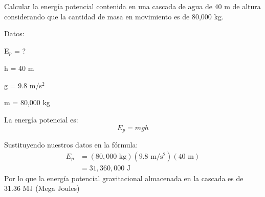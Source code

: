 \question[5] Calcular la energía potencial contenida en una cascada de agua de 40 m de altura considerando que la cantidad de masa en movimiento es de 80,000 kg.

\begin{solutionbox}{5.5cm}
    \begin{multicols}{2}
        Datos:

        E$_p$ = ?

        h = 40 m

        g = 9.8 m/s$^2$

        m = 80,000 kg

        La energía potencial es:
        \[E_p=mgh\]

        \vspace{2cm}

        Sustituyendo nuestros datos en la fórmula:
        \[
            \begin{array}{rl}
                E_p & = (80,000 \text{ kg})(9.8 \text{ m/s$^2$})(40 \text{ m}) \\[1em]
                    & =31,360,000 \text{ J }
            \end{array}
        \]
        Por lo que la energía potencial gravitacional almacenada en la cascada es de 31.36 MJ (Mega Joules)
    \end{multicols}
\end{solutionbox}
